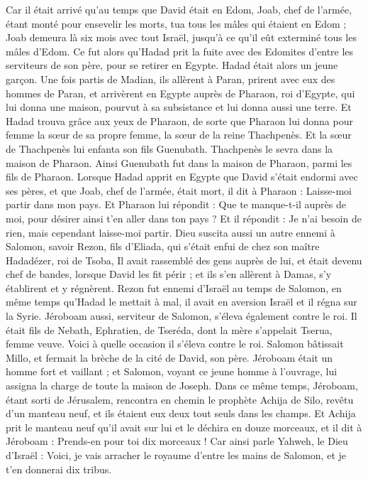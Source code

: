 \begin{multicols}{2}
Car il était arrivé qu'au temps que David était en Edom, Joab, chef de l'armée, étant monté pour ensevelir les morts, tua tous les mâles qui étaient en Edom ;
Joab demeura là six mois avec tout Israël, jusqu'à ce qu'il eût exterminé tous les mâles d'Edom.
Ce fut alors qu’Hadad prit la fuite avec des Edomites d'entre les serviteurs de son père, pour se retirer en Egypte. Hadad était alors un jeune garçon.
Une fois partis de Madian, ils allèrent à Paran, prirent avec eux des hommes de Paran, et arrivèrent en Egypte auprès de Pharaon, roi d'Egypte, qui lui donna une maison, pourvut à sa subsistance et lui donna aussi une terre.
Et Hadad trouva grâce aux yeux de Pharaon, de sorte que Pharaon lui donna pour femme la sœur de sa propre femme, la sœur de la reine Thachpenès.
Et la sœur de Thachpenès lui enfanta son fils Guenubath. Thachpenès le sevra dans la maison de Pharaon. Ainsi Guenubath fut dans la maison de Pharaon, parmi les fils de Pharaon.
Lorsque Hadad apprit en Egypte que David s'était endormi avec ses pères, et que Joab, chef de l'armée, était mort, il dit à Pharaon : Laisse-moi partir dans mon pays.
Et Pharaon lui répondit : Que te manque-t-il auprès de moi, pour désirer ainsi t'en aller dans ton pays ? Et il répondit : Je n’ai besoin de rien, mais cependant laisse-moi partir.
Dieu suscita aussi un autre ennemi à Salomon, savoir Rezon, fils d'Eliada, qui s'était enfui de chez son maître Hadadézer, roi de Tsoba,
Il avait rassemblé des gens auprès de lui, et était devenu chef de bandes, lorsque David les fit périr ; et ils s'en allèrent à Damas, s’y établirent et y régnèrent.
Rezon fut ennemi d'Israël au temps de Salomon, en même temps qu’Hadad le mettait à mal, il avait en aversion Israël et il régna sur la Syrie.
Jéroboam aussi, serviteur de Salomon, s'éleva également contre le roi. Il était fils de Nebath, Ephratien, de Tseréda, dont la mère s’appelait Tserua, femme veuve.
Voici à quelle occasion il s'éleva contre le roi. Salomon bâtissait Millo, et fermait la brèche de la cité de David, son père.
Jéroboam était un homme fort et vaillant ; et Salomon, voyant ce jeune homme à l’ouvrage, lui assigna la charge de toute la maison de Joseph.
Dans ce même temps, Jéroboam, étant sorti de Jérusalem, rencontra en chemin le prophète Achija de Silo, revêtu d'un manteau neuf, et ils étaient eux deux tout seuls dans les champs.
Et Achija prit le manteau neuf qu'il avait sur lui et le déchira en douze morceaux,
et il dit à Jéroboam : Prends-en pour toi dix morceaux ! Car ainsi parle Yahweh, le Dieu d'Israël : Voici, je vais arracher le royaume d'entre les mains de Salomon, et je t'en donnerai dix tribus.

\end{multicols}
